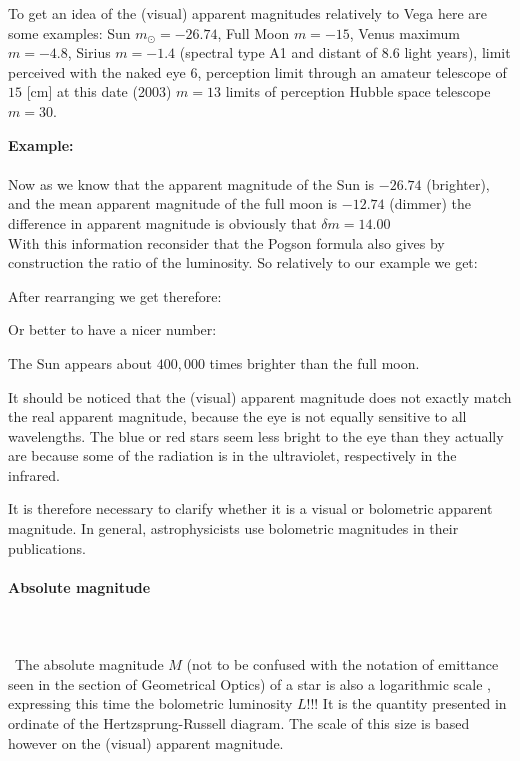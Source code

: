 	To get an idea of the (visual) apparent magnitudes relatively to Vega here are some examples: Sun $m_{\odot}=-26.74$, Full Moon $m=-15$, Venus maximum $m=-4.8$, Sirius $m=-1.4$ (spectral type A1 and distant of $8.6$ light years), limit perceived with the naked eye $6$, perception limit through an amateur telescope of $15$ [cm] at this date (2003) $m=13$ limits of perception Hubble space telescope $m=30$.
	\begin{tcolorbox}[colframe=black,colback=white,sharp corners]
	\textbf{{\Large {}}Example:}\\\\
	Now as we know that the apparent magnitude of the Sun is $-26.74$ (brighter), and the mean apparent magnitude of the full moon is $-12.74$ (dimmer) the difference in apparent magnitude is obviously that $\delta m=14.00$\\

	With this information reconsider that the Pogson formula also gives by construction the ratio of the luminosity. So relatively to our example we get:
	
	After rearranging we get therefore:
	
	Or better to have a nicer number:
	
	The Sun appears about $400,000$ times brighter than the full moon.
	\end{tcolorbox}
	It should be noticed that the (visual) apparent magnitude does not exactly match the real apparent magnitude, because the eye is not equally sensitive to all wavelengths. The blue or red stars seem less bright to the eye than they actually are because some of the radiation is in the ultraviolet, respectively in the infrared.

	It is therefore necessary to clarify whether it is a  visual or bolometric apparent magnitude. In general, astrophysicists use bolometric magnitudes in their publications.
	
	\paragraph{Absolute magnitude}\mbox{}\\\\\
	The absolute magnitude $M$ (not to be confused with the notation of emittance seen in the section of Geometrical Optics) of a star is also a logarithmic scale , expressing this time the bolometric luminosity $L$!!! It is the quantity presented in ordinate of the Hertzsprung-Russell diagram. The scale of this size is based however on the (visual) apparent magnitude.

